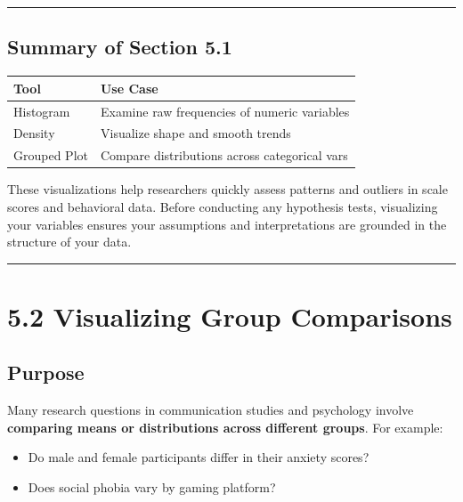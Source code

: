 \documentclass[
]{book}
\providecommand{\tightlist}{%
  \setlength{\itemsep}{0pt}\setlength{\parskip}{0pt}}
\begin{document}
\begin{center}\rule{0.5\linewidth}{0.5pt}\end{center}

\subsection{Summary of Section 5.1}\label{summary-of-section-5.1}

\begin{longtable}[]{@{}ll@{}}
\toprule\noalign{}
Tool & Use Case \\
\midrule\noalign{}
\endhead
\bottomrule\noalign{}
\endlastfoot
Histogram & Examine raw frequencies of numeric variables \\
Density & Visualize shape and smooth trends \\
Grouped Plot & Compare distributions across categorical vars \\
\end{longtable}

These visualizations help researchers quickly assess patterns and outliers in scale scores and behavioral data. Before conducting any hypothesis tests, visualizing your variables ensures your assumptions and interpretations are grounded in the structure of your data.

\begin{center}\rule{0.5\linewidth}{0.5pt}\end{center}

\section{5.2 Visualizing Group Comparisons}\label{visualizing-group-comparisons}

\subsection{Purpose}\label{purpose-1}

Many research questions in communication studies and psychology involve \textbf{comparing means or distributions across different groups}. For example:

\begin{itemize}
\tightlist
\item
  Do male and female participants differ in their anxiety scores?
\item
  Does social phobia vary by gaming platform?
\end{itemize}
\end{document}
